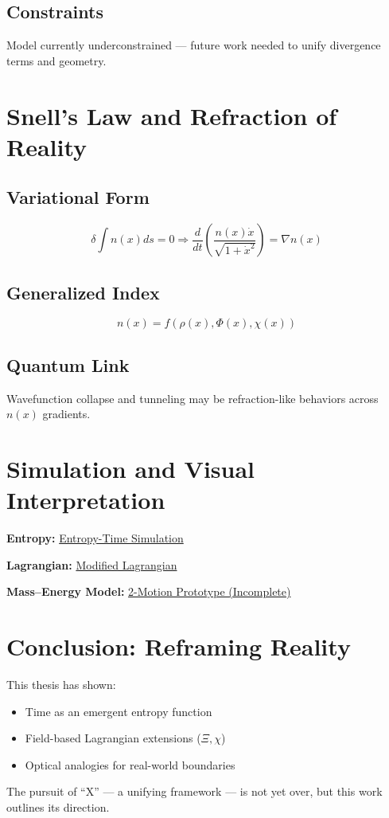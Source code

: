 \documentclass[12pt]{article}
\begin{document}
\subsection*{Constraints}
Model currently underconstrained — future work needed to unify divergence terms and geometry.

\section{Snell’s Law and Refraction of Reality}

\subsection*{Variational Form}
\[
\delta \int n(x) ds = 0 \Rightarrow \frac{d}{dt} \left( \frac{n(x)\dot{x}}{\sqrt{1+\dot{x}^2}} \right) = \nabla n(x)
\]

\subsection*{Generalized Index}
\[
n(x) = f(\rho(x), \Phi(x), \chi(x))
\]

\subsection*{Quantum Link}
Wavefunction collapse and tunneling may be refraction-like behaviors across \( n(x) \) gradients.

\section{Simulation and Visual Interpretation}

\textbf{Entropy:}
\href{https://www.wolframcloud.com/obj/a930d0a5-5363-451a-98bf-c57df8cd1258}{Entropy-Time Simulation}

\textbf{Lagrangian:}
\href{https://www.wolframcloud.com/obj/7d3daeff-075a-4d21-a181-63349d9b2cee}{Modified Lagrangian}

\textbf{Mass–Energy Model:}
\href{https://www.wolframcloud.com/obj/cb2a2fc7-cbdf-4031-a0bf-483cbdb8f509}{2-Motion Prototype (Incomplete)}

\section{Conclusion: Reframing Reality}
This thesis has shown:
\begin{itemize}
\item Time as an emergent entropy function
\item Field-based Lagrangian extensions (\( \Xi, \chi \))
\item Optical analogies for real-world boundaries
\end{itemize}
The pursuit of “X” — a unifying framework — is not yet over, but this work outlines its direction.
\end{document}
